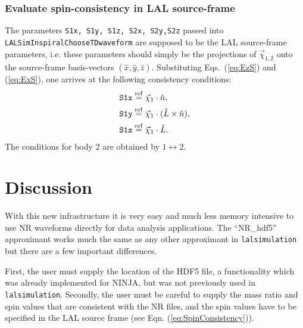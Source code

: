 \documentclass[11pt,tightenlines,article,amssymb,amsmath,amsfonts,superscriptaddress,nofootinbib]{revtex4}
\newcommand{\nNR}{\hat{n}}
\newcommand{\lNR}{\hat L}
\newcommand{\ExS}{{{\hat x}}}
\newcommand{\EyS}{{{\hat y}}}
\newcommand{\EzS}{{{\hat z}}}
\newcommand{\equalref}{\overset{\rm ref}{=}}
\begin{document}
\subsubsection{Evaluate spin-consistency in LAL source-frame}

The parameters {\tt S1x, S1y, S1z, S2x, S2y,S2z} passed into {\tt
  LALSimInspiralChooseTDwaveform} are supposed to be the LAL
source-frame parameters, i.e. these parameters should simply be the
projections of $\vec\chi_{1,2}$ onto the source-frame basis-vectors
$(\ExS,\EyS,\EzS)$.  Substituting Eqs.~(\ref{eq:EzS}) and (\ref{eq:ExS}),
one arrives at the following consistency conditions:
\begin{subequations}
\label{eq:SpinConsistency}
  \begin{align}
    \mbox{\tt S1x} &  \equalref \vec\chi_1 \cdot \nNR,\\
    \mbox{\tt S1y} &  \equalref \vec\chi_1\cdot (\lNR\times\nNR),\\
    \mbox{\tt S1z} &  \equalref \vec\chi_1 \cdot \lNR.
  \end{align}
\end{subequations}
The conditions for body 2 are obtained by $1\leftrightarrow 2$.\\


\section{Discussion}
\label{sec:discussion}

With this new infrastructure it is very easy and much less memory intensive to use NR waveforms
directly for data analysis applications. The ``NR\_hdf5'' approximant works much the same as any other approximant
in \texttt{lalsimulation} but there are a few important differences.

First, the user must supply the location of the HDF5 file, a functionality which was already implemented for NINJA, but was not
previously used in \texttt{lalsimulation}. Secondly, the user must be careful to supply the mass ratio and spin values that
are consistent with the NR files, and the spin values have to be specified in the LAL source frame (see Eqn. (\ref{eq:SpinConsistency})). 
\end{document}

